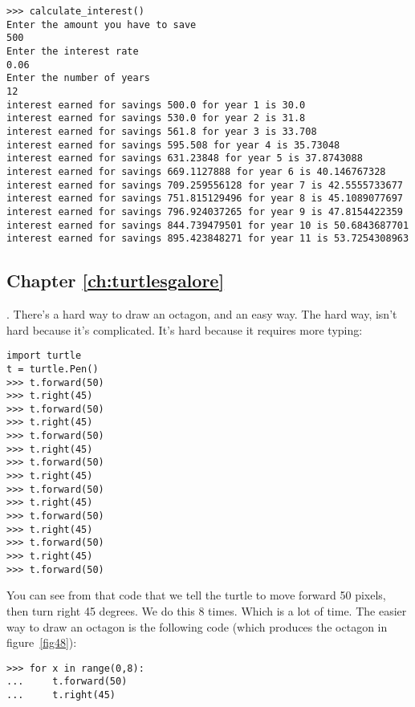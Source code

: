 \begin{listingignore}
\begin{verbatim}
>>> calculate_interest()
Enter the amount you have to save
500
Enter the interest rate
0.06
Enter the number of years
12
interest earned for savings 500.0 for year 1 is 30.0
interest earned for savings 530.0 for year 2 is 31.8
interest earned for savings 561.8 for year 3 is 33.708
interest earned for savings 595.508 for year 4 is 35.73048
interest earned for savings 631.23848 for year 5 is 37.8743088
interest earned for savings 669.1127888 for year 6 is 40.146767328
interest earned for savings 709.259556128 for year 7 is 42.5555733677
interest earned for savings 751.815129496 for year 8 is 45.1089077697
interest earned for savings 796.924037265 for year 9 is 47.8154422359
interest earned for savings 844.739479501 for year 10 is 50.6843687701
interest earned for savings 895.423848271 for year 11 is 53.7254308963
\end{verbatim}
\end{listingignore}

\subsection*{Chapter \ref{ch:turtlesgalore}}

. There's a hard way to draw an octagon, and an easy way.  The hard way, isn't hard because it's complicated.  It's hard because it requires more typing:

\begin{listing}
\begin{verbatim}
import turtle
t = turtle.Pen()
>>> t.forward(50)
>>> t.right(45)
>>> t.forward(50)
>>> t.right(45)
>>> t.forward(50)
>>> t.right(45)
>>> t.forward(50)
>>> t.right(45)
>>> t.forward(50)
>>> t.right(45)
>>> t.forward(50)
>>> t.right(45)
>>> t.forward(50)
>>> t.right(45)
>>> t.forward(50)
\end{verbatim}
\end{listing}

\noindent
You can see from that code that we tell the turtle to move forward 50 pixels, then turn right 45 degrees.  We do this 8 times.  Which is a lot of time.  The easier way to draw an octagon is the following code (which produces the octagon in figure~\ref{fig48}):

\begin{listing}
\begin{verbatim}
>>> for x in range(0,8):
...     t.forward(50)
...     t.right(45)
\end{verbatim}
\end{listing}

